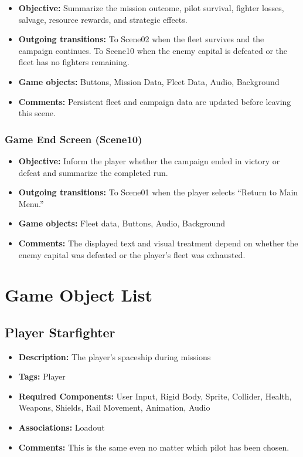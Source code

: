 \documentclass[journal]{IEEEtran}
\begin{document}
\begin{itemize}
    \item \textbf{Objective:}
    Summarize the mission outcome, pilot survival, fighter losses,
    salvage, resource rewards, and strategic effects.

    \item \textbf{Outgoing transitions:}
    To Scene02 when the fleet survives and the campaign continues.
    To Scene10 when the enemy capital is defeated or the fleet has
    no fighters remaining.

    \item \textbf{Game objects:}
    Buttons, Mission Data, Fleet Data, Audio, Background

    \item \textbf{Comments:}
    Persistent fleet and campaign data are updated before leaving
    this scene.
\end{itemize}


\subsubsection{Game End Screen (Scene10)}

\begin{itemize}
    \item \textbf{Objective:}
    Inform the player whether the campaign ended in victory or defeat
    and summarize the completed run.

    \item \textbf{Outgoing transitions:}
    To Scene01 when the player selects ``Return to Main Menu.''

    \item \textbf{Game objects:}
    Fleet data, Buttons, Audio, Background

    \item \textbf{Comments:}
    The displayed text and visual treatment depend on whether the
    enemy capital was defeated or the player's fleet was exhausted.
\end{itemize}
\section{Game Object List}

\subsection{Player Starfighter}

\begin{itemize}
    \item \textbf{Description:} The player's spaceship during missions
    \item \textbf{Tags:} Player 
    \item \textbf{Required Components: } User Input, Rigid Body, Sprite, Collider, Health, Weapons, Shields, Rail Movement, Animation, Audio
    \item \textbf{Associations: } Loadout
    \item \textbf{Comments: } This is the same even no matter which pilot has been chosen.
\end{itemize}
\end{document}
